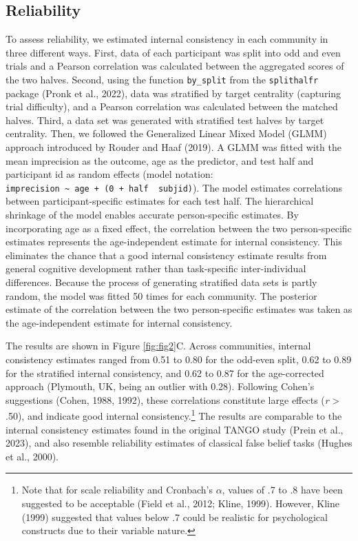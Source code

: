 \documentclass[
  man,floatsintext]{apa7}
\begin{document}
\subsection{Reliability}\label{reliability}

To assess reliability, we estimated internal consistency in each community in three different ways.
First, data of each participant was split into odd and even trials and a Pearson correlation was calculated between the aggregated scores of the two halves.
Second, using the function \texttt{by\_split} from the \texttt{splithalfr} package (Pronk et al., 2022), data was stratified by target centrality (capturing trial difficulty), and a Pearson correlation was calculated between the matched halves.
Third, a data set was generated with stratified test halves by target centrality.
Then, we followed the Generalized Linear Mixed Model (GLMM) approach introduced by Rouder and Haaf (2019).
A GLMM was fitted with the mean imprecision as the outcome, age as the predictor, and test half and participant id as random effects (model notation: \texttt{imprecision\ \textasciitilde{}\ age\ +\ (0\ +\ half\ \textbar{}\ subjid)}).
The model estimates correlations between participant-specific estimates for each test half.
The hierarchical shrinkage of the model enables accurate person-specific estimates.
By incorporating age as a fixed effect, the correlation between the two person-specific estimates represents the age-independent estimate for internal consistency.
This eliminates the chance that a good internal consistency estimate results from general cognitive development rather than task-specific inter-individual differences.
Because the process of generating stratified data sets is partly random, the model was fitted 50 times for each community.
The posterior estimate of the correlation between the two person-specific estimates was taken as the age-independent estimate for internal consistency.

The results are shown in Figure \ref{fig:fig2}C.
Across communities, internal consistency estimates ranged from 0.51 to 0.80 for the odd-even split, 0.62 to 0.89 for the stratified internal consistency, and 0.62 to 0.87 for the age-corrected approach (Plymouth, UK, being an outlier with 0.28).
Following Cohen's suggestions (Cohen, 1988, 1992), these correlations constitute large effects (\emph{r} \textgreater{} .50), and indicate good internal consistency.\footnote{Note that for scale reliability and Cronbach's \(\alpha\), values of .7 to .8 have been suggested to be acceptable (Field et al., 2012; Kline, 1999). However, Kline (1999) suggested that values below .7 could be realistic for psychological constructs due to their variable nature.}
The results are comparable to the internal consistency estimates found in the original TANGO study (Prein et al., 2023), and also resemble reliability estimates of classical false belief tasks (Hughes et al., 2000).
\end{document}
